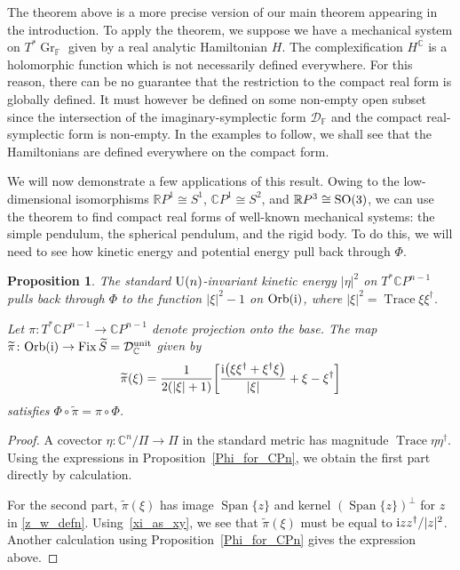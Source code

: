 \documentclass[pdftex]{sigma}
\numberwithin{equation}{section}
\newtheorem{Proposition}[Theorem]{Proposition}
 { \theoremstyle{definition}
\newtheorem{Definition}[Theorem]{Definition}
\newtheorem{Note}[Theorem]{Note}
\newtheorem{Example}[Theorem]{Example}
\newtheorem{Remark}[Theorem]{Remark} }
\DeclareMathOperator{\Span}{Span}
\DeclareMathOperator{\fix}{Fix}
\DeclareMathOperator{\Gr}{Gr}
\DeclareMathOperator{\Tr}{Trace}
\newcommand{\C}{\mathbb{C}}
\newcommand{\CP}{\mathbb{C}P}
\newcommand{\D}{\mathcal{D}}
\newcommand{\RP}{\mathbb{R}P}
\begin{document}
\begin{Remark}The theorem above is a more precise version of our main theorem appearing in the introduction. To apply the theorem, we suppose we have a mechanical system on $T^*\Gr_\mathbb{F}$ given by a real analytic Hamiltonian $H$. The complexification $H^\C$ is a holomorphic function which is not necessarily defined everywhere. For this reason, there can be no guarantee that the restriction to the compact real form is globally defined. It must however be defined on some non-empty open subset since the intersection of the imaginary-symplectic form $\D_\mathbb{F}$ and the compact real-symplectic form is non-empty. In the examples to follow, we shall see that the Hamiltonians are defined everywhere on the compact form.
\end{Remark}
	We will now demonstrate a few applications of this result. Owing to the low-dimensional isomorphisms $\RP^1\cong S^1$, $\CP^1\cong S^2$, and $\RP^3\cong {\rm SO}(3)$, we can use the theorem to find compact real forms of well-known mechanical systems: the simple pendulum, the spherical pendulum, and the rigid body. To do this, we will need to see how kinetic energy and potential energy pull back through $\Phi$.
	\begin{Proposition}\label{pullbacks_explicit}
		The standard ${\rm U}(n)$-invariant kinetic energy $|\eta|^2$ on $T^*\CP^{n-1}$ pulls back through $\Phi$ to the function $|\xi|^2-1$ on ${\rm Orb}({\rm i})$, where $|\xi|^2=\Tr\xi\xi^\dagger$.
		
		Let $\pi\colon T^*\CP^{n-1}\rightarrow\CP^{n-1}$ denote projection onto the base. The map $\widetilde{\pi}\colon{\rm Orb}({\rm i}) \rightarrow\fix\widetilde{S}=\D_{\C}^{\rm unit}$ given by
		\begin{equation}\label{bundle_map}
			\widetilde{\pi}(\xi)=\frac{1}{2(|\xi|+1)}\biggl[\frac{{\rm i}\bigl(\xi\xi^\dagger+\xi^\dagger\xi\bigr)}{|\xi|}+\xi-\xi^\dagger\biggr]
		\end{equation}
		satisfies $\Phi\circ\widetilde{\pi}=\pi\circ\Phi$.
	\end{Proposition}
	\begin{proof}
		A covector $\eta\colon\C^n/\Pi\rightarrow\Pi$ in the standard metric has magnitude $\Tr\eta\eta^\dagger$. Using the expressions in Proposition~\ref{Phi_for_CPn}, we obtain the first part directly by calculation.
		
		For the second part, $\widetilde{\pi}(\xi)$ has image $\Span\{z\}$ and kernel $(\Span\{z\})^\perp$ for $z$ in \eqref{z_w_defn}. Using~\eqref{xi_as_xy}, we see that $\widetilde{\pi}(\xi)$ must be equal to ${\rm i}{z}{z}^\dagger/|z|^2$. Another calculation using Proposition~\ref{Phi_for_CPn} gives the expression above.
	\end{proof}
\end{document}
